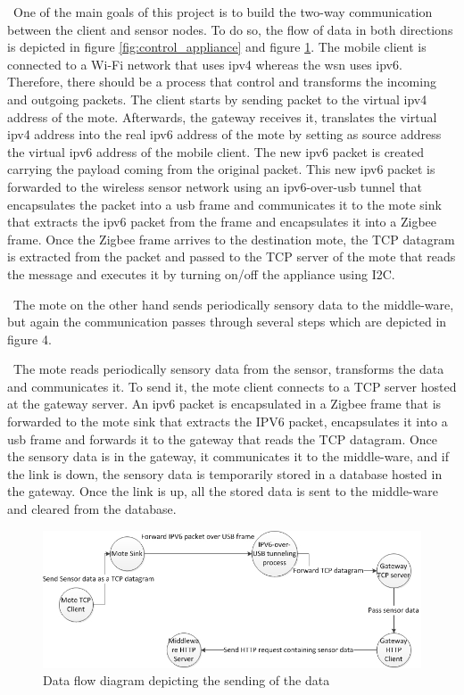 \documentclass[conference]{IEEEtran}
\begin{document}
\
One of the main goals of this project is to build the two-way communication between the client and sensor nodes. To do so, the flow of data in both directions is depicted in figure \ref{fig:control_appliance} and figure \ref{fig:send_data}. The mobile client is connected to a Wi-Fi network that uses \gls{ipv4} whereas the \gls{wsn} uses \gls{ipv6}. Therefore, there should be a process that control and transforms the incoming and outgoing packets. The client starts by sending packet to the virtual \gls{ipv4} address of the mote. Afterwards, the gateway receives it, translates the virtual \gls{ipv4} address into the real \gls{ipv6} address of the mote by setting as source address the virtual \gls{ipv6} address of the mobile client. The new \gls{ipv6} packet is created carrying the payload coming from the original packet. This new \gls{ipv6} packet is forwarded to the wireless sensor network using an \gls{ipv6}-over-\gls{usb} tunnel that encapsulates the packet into a \gls{usb} frame and communicates it to the mote sink that extracts the \gls{ipv6} packet from the frame and encapsulates it into a Zigbee frame. Once the Zigbee frame arrives to the destination mote, the TCP datagram is extracted from the packet and passed to the TCP server of the mote that reads the message and executes it by turning on/off the appliance using I2C. 

\
The mote on the other hand sends periodically sensory data to the middle-ware, but again the communication passes through several steps which are depicted in figure 4.

\
The mote reads periodically sensory data from the sensor, transforms the data and communicates it. To send it, the mote client connects to a TCP server hosted at the gateway server. An \gls{ipv6} packet is encapsulated in a Zigbee frame that is forwarded to the mote sink that extracts the IPV6 packet, encapsulates it into a \gls{usb} frame and forwards it to the gateway that reads the TCP datagram. Once the sensory data is in the gateway, it communicates it to the middle-ware, and if the link is down, the sensory data is temporarily stored in a database hosted in the gateway. Once the link is up, all the stored data is sent to the middle-ware and cleared from the database.

\begin{figure}[htbp]
\centering
\includegraphics[scale=2.6]{images/send_sensor_data_data_flow.jpg}
\caption{Data flow diagram depicting the sending of the data}
\label{fig:send_data}
\end{figure}
\end{document}
